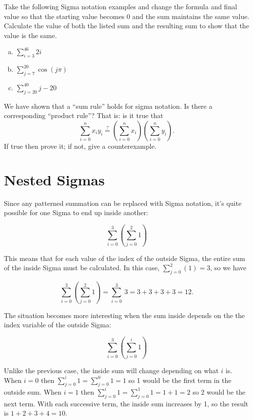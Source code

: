 \begin {exercise}{}
Take the following Sigma notation examples and change the formula and final value so that the starting value becomes 0 and the sum maintains the same value.  Calculate the value of both the listed sum and the resulting sum to show that the value is the same.
\begin {enumerate} [(a)]
 \item
$\displaystyle{\sum_{i=3}^{46}2i}$
\item
$\displaystyle{\sum_{j=7}^{20}\cos(j\pi )}$
\item
$\displaystyle{\sum_{j=20}^{40}j-20}$
\end {enumerate}
\end{exercise}

\begin {exercise}{}
We have shown that a ``sum rule'' holds for sigma notation.  Is there a corresponding ``product rule''? That is: is it true that
\[ \sum_{i=0}^n x_i y_i \stackrel{?}{=} \left(\sum_{i=0}^n x_i \right) \left(  \sum_{i=0}^n y_i \right). \]
If true then prove it; if not, give a counterexample.
\end{exercise}


\section{Nested Sigmas}
Since any  patterned summation can be replaced with Sigma notation, it's quite possible for one Sigma to end up inside another:

\[\sum_{i=0}^{3}\left( \sum_{j=0}^{2}1\right)\]

This means that for each value of the index of the outside Sigma, the entire sum of the inside Sigma must be calculated.  In this case, $\sum_{j=0}^{2}(1)=3$, so we have

\[\sum_{i=0}^{3}\left( \sum_{j=0}^{2}1\right) =  \sum_{i=0}^{3}\ 3  = 3+3+3+3 = 12. \]

The situation becomes more interesting when the sum inside depends on the the index variable of the outside Sigma:

\[\sum_{i=0}^{3}\left(\sum_{j=0}^{i}1\right)\]

Unlike the previous case, the inside sum will change depending on what $i$ is.  When $i=0$ then $\sum_{j=0}^{i}1=\sum_{j=0}^{0}1=1$ so 1 would be the first term in the outside sum.  When $i=1$ then $\sum_{j=0}^{i}1=\sum_{j=0}^{1}1=1+1=2$ so 2 would be the next term.  With each successive term, the inside sum increases by 1, so the result is $1+2+3+4 = 10$.

